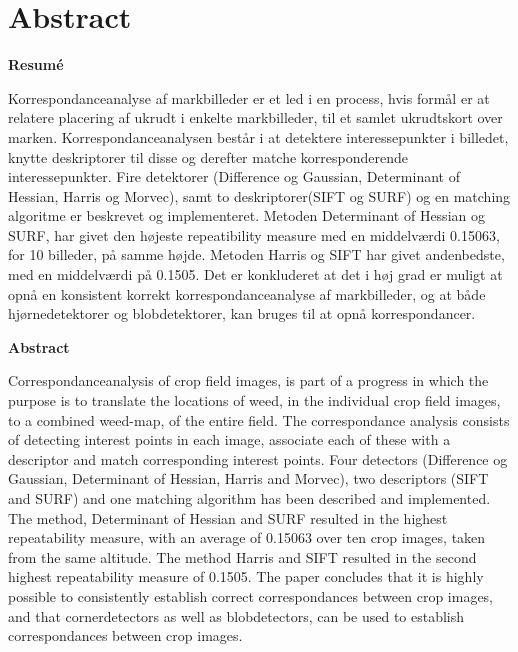 \chapter{Abstract} \label{sec:abstract}
\vspace{2cm}
\begin{center}
\textbf{Resumé}
\end{center}
Korrespondanceanalyse af markbilleder er et led i en process, hvis formål er at relatere placering af ukrudt i enkelte markbilleder,
til et samlet ukrudtskort over marken. Korrespondanceanalysen består i at detektere interessepunkter i billedet, knytte deskriptorer til disse og derefter matche korresponderende interessepunkter. Fire detektorer (Difference og Gaussian, Determinant of Hessian, Harris og Morvec), samt to deskriptorer(SIFT og SURF) og en matching algoritme er beskrevet og implementeret. Metoden Determinant of Hessian og SURF, har givet den højeste repeatibility measure med en middelværdi 0.15063, for 10 billeder, på samme højde. Metoden Harris og SIFT har givet andenbedste, med en middelværdi på 0.1505. Det er konkluderet at det i høj grad er muligt at opnå en konsistent korrekt korrespondanceanalyse af markbilleder, og at både hjørnedetektorer og blobdetektorer, kan bruges til at opnå korrespondancer.
\vspace{2cm}
\begin{center}
\textbf{Abstract}
\end{center}
Correspondanceanalysis of crop field images, is part of a progress in which the purpose is to translate the locations of weed, in the individual crop field images, to a combined weed-map, of the entire field. The correspondance analysis consists of detecting interest points in each image, associate each of these with a descriptor and match corresponding interest points. Four detectors (Difference og Gaussian, Determinant of Hessian, Harris and Morvec), two descriptors (SIFT and SURF) and one matching algorithm has been described and implemented. The method, Determinant of Hessian and SURF resulted in the highest repeatability measure, with an average of 0.15063 over ten crop images, taken from the same altitude. The method Harris and SIFT resulted in the second highest repeatability measure of 0.1505. The paper concludes that it is highly possible to consistently establish correct correspondances between crop images, and that cornerdetectors as well as blobdetectors, can be used to establish correspondances between crop images.